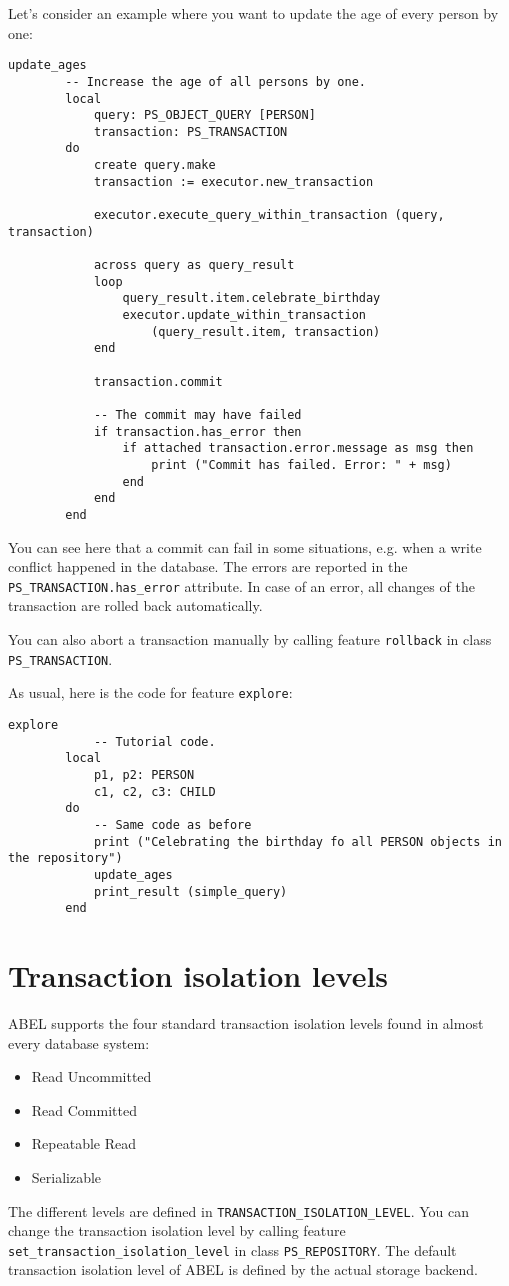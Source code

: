 \documentclass[a4paper,12pt]{report}
\begin{document}
Let's consider an example where you want to update the age of every person by one:

\begin{lstlisting}[language=OOSC2Eiffel, captionpos=b, caption={}, label={lst:update_all_ages}]
	update_ages
		-- Increase the age of all persons by one.
		local
			query: PS_OBJECT_QUERY [PERSON]
			transaction: PS_TRANSACTION
		do
			create query.make
			transaction := executor.new_transaction

			executor.execute_query_within_transaction (query, transaction)

			across query as query_result
			loop
				query_result.item.celebrate_birthday
				executor.update_within_transaction 
					(query_result.item, transaction)
			end

			transaction.commit

			-- The commit may have failed
			if transaction.has_error then
				if attached transaction.error.message as msg then
					print ("Commit has failed. Error: " + msg)
				end
			end
		end
\end{lstlisting}

You can see here that a commit can fail in some situations, e.g. when a write conflict happened in the database.
The errors are reported in the \lstinline!PS_TRANSACTION.has_error! attribute.
In case of an error, all changes of the transaction are rolled back automatically.

You can also abort a transaction manually by calling feature \lstinline{rollback} in class \lstinline{PS_TRANSACTION}.

As usual, here is the code for feature \lstinline{explore}:
\begin{lstlisting}[language=OOSC2Eiffel, captionpos=b, caption={Testing an update with explicit transaction.}, label={lst:explicit_transactions_update}]
	explore
			-- Tutorial code.
		local
			p1, p2: PERSON
			c1, c2, c3: CHILD
		do
			-- Same code as before
			print ("Celebrating the birthday fo all PERSON objects in the repository")
			update_ages
			print_result (simple_query)
		end
\end{lstlisting}




\section{Transaction isolation levels}

ABEL supports the four standard transaction isolation levels found in almost every database system:
\begin{itemize}
 \item Read Uncommitted
 \item Read Committed
 \item Repeatable Read
 \item Serializable
\end{itemize}
The different levels are defined in \lstinline!TRANSACTION_ISOLATION_LEVEL!.
You can change the transaction isolation level by calling feature\\
 \lstinline{set_transaction_isolation_level} in class \lstinline{PS_REPOSITORY}.
The default transaction isolation level of ABEL is defined by the actual storage backend.
\end{document}
